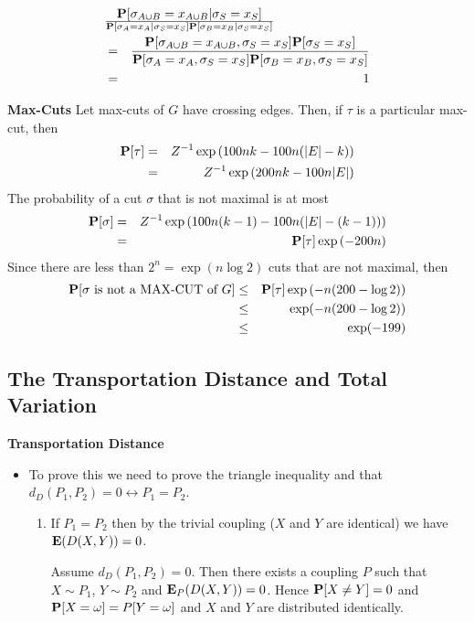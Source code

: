 \documentclass[11pt]{article} \usepackage{amssymb}
\newcommand{\E}{{\bf E}} \newcommand{\Cov}{{\bf Cov}}
\begin{document}
\begin{eqnarray*}
\lefteqn{\P[\sigma_{A\cup B}=x_{A\cup B}|\sigma_S=x_S]\over  
    \P[\sigma_A=x_A|\sigma_S=x_S]\P[\sigma_B=x_B|\sigma_S=x_S]}
\\  &=&   {\P[\sigma_{A\cup B}=x_{A\cup B},\sigma_S=x_S]\P[\sigma_S=x_S]\over  
    \P[\sigma_A=x_A,\sigma_S=x_S]\P[\sigma_B=x_B,\sigma_S=x_S]}
\\ &=& 
1
\end{eqnarray*}

{\bf Max-Cuts}
Let max-cuts of $G$ have crossing edges. Then, if $\tau$ is a particular
max-cut, then
\begin{eqnarray*}
  \P[\tau]&=&Z^{-1}\exp\left(100nk-100n(|E|-k)\right)
  \\ &=& Z^{-1}\exp\left(200nk-100n|E|\right)
\end{eqnarray*}
The probability of a cut $\sigma$ that is not maximal is at most
\begin{eqnarray*}
  \P[\sigma]&=&Z^{-1}\exp\left(100n(k-1)-100n(|E|-(k-1))\right)
  \\ &=& \P[\tau]\exp\left(-200n\right)
\end{eqnarray*}
Since there are less than $2^n=\exp(n\log 2)$ cuts that are not maximal, then
\begin{eqnarray*}
  \P[\sigma\mbox{ is not a MAX-CUT of $G$}] &\leq& \P[\tau]\exp\left(-n(200-\log 2)\right)
\\ &\leq& \exp(-n(200-\log 2)) 
\\ &\leq& \exp(-199) 
\end{eqnarray*}

\subsection{The Transportation Distance and Total Variation}
{\bf Transportation Distance}
\begin{itemize}
\item To prove this we need to prove the triangle inequality and that
  $d_D(P_1,P_2)=0 \leftrightarrow P_1=P_2$.
  \begin{enumerate}
  \item If $P_1=P_2$ then by the trivial coupling ($X$ and $Y$ are identical)
    we have $\E(D(X,Y))=0$. 

    Assume $d_D(P_1,P_2)=0$. Then there exists a coupling $P$ such that  
    $X\sim P_1$, $Y\sim P_2$ and $\E_P(D(X,Y))=0$. Hence $\P[X\neq Y]=0$ and
    $\P[X=\omega]=P[Y=\omega]$ and $X$ and $Y$ are distributed identically.
  \end{enumerate}
\end{itemize}
\end{document}
